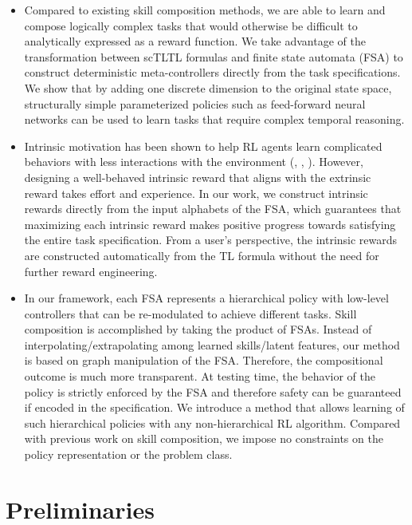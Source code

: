 \documentclass{article}
\begin{document}
\begin{itemize}
\item Compared to existing skill composition methods, we are able to learn and compose logically complex tasks that would otherwise be difficult to analytically expressed as a reward function. We take advantage of the transformation between scTLTL formulas and finite state automata (FSA) to construct deterministic meta-controllers directly from the task specifications. We show that by adding one discrete dimension to the original state space, structurally simple parameterized policies such as feed-forward neural networks can be used to learn tasks that require complex temporal reasoning.

\item Intrinsic motivation has been shown to help RL agents learn complicated behaviors with less interactions with the environment (\cite{Singh2004}, \cite{Kulkarni2016}, \cite{jaderberg2016reinforcement}).  However, designing a well-behaved intrinsic reward that aligns with the extrinsic reward takes effort and experience. In our work, we construct intrinsic rewards directly from the input alphabets of the FSA, which guarantees that maximizing each intrinsic reward makes positive progress towards satisfying the entire task specification. From a user's perspective, the intrinsic rewards are constructed automatically from the TL formula without the need for further reward engineering. 

\item In our framework, each FSA represents a hierarchical policy with low-level controllers that can be re-modulated to achieve different tasks. Skill composition is accomplished by taking  the product of FSAs. Instead of interpolating/extrapolating among learned skills/latent features, our method is based on graph manipulation of the FSA. Therefore, the compositional outcome is much more transparent. At testing time, the behavior of the policy is strictly enforced by the FSA and therefore safety can be guaranteed if encoded in the specification. We introduce a method that allows learning of such hierarchical policies with any non-hierarchical RL algorithm. Compared with previous work on skill composition, we impose no constraints on the policy representation or the problem class.
\end{itemize}
 
 
\section{Preliminaries}
\label{sec:background}
\end{document}
